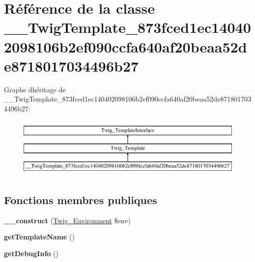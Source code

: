 \hypertarget{class_____twig_template__873fced1ec140402098106b2ef090ccfa640af20beaa52de8718017034496b27}{}\section{Référence de la classe \+\_\+\+\_\+\+Twig\+Template\+\_\+873fced1ec140402098106b2ef090ccfa640af20beaa52de8718017034496b27}
\label{class_____twig_template__873fced1ec140402098106b2ef090ccfa640af20beaa52de8718017034496b27}
Graphe d\textquotesingle{}héritage de \+\_\+\+\_\+\+Twig\+Template\+\_\+873fced1ec140402098106b2ef090ccfa640af20beaa52de8718017034496b27\+:\begin{figure}[H]
\begin{center}
\leavevmode
\includegraphics[height=3.000000cm]{class_____twig_template__873fced1ec140402098106b2ef090ccfa640af20beaa52de8718017034496b27}
\end{center}
\end{figure}
\subsection*{Fonctions membres publiques}
\begin{DoxyCompactItemize}
\item 
{\bfseries \+\_\+\+\_\+construct} (\hyperlink{class_twig___environment}{Twig\+\_\+\+Environment} \$env)\hypertarget{class_____twig_template__873fced1ec140402098106b2ef090ccfa640af20beaa52de8718017034496b27_a4f8326243132c1450a81e0a817aa1be7}{}\label{class_____twig_template__873fced1ec140402098106b2ef090ccfa640af20beaa52de8718017034496b27_a4f8326243132c1450a81e0a817aa1be7}

\item 
{\bfseries get\+Template\+Name} ()\hypertarget{class_____twig_template__873fced1ec140402098106b2ef090ccfa640af20beaa52de8718017034496b27_a621a3ccd148ed8b9e937da6959c98f39}{}\label{class_____twig_template__873fced1ec140402098106b2ef090ccfa640af20beaa52de8718017034496b27_a621a3ccd148ed8b9e937da6959c98f39}

\item 
{\bfseries get\+Debug\+Info} ()\hypertarget{class_____twig_template__873fced1ec140402098106b2ef090ccfa640af20beaa52de8718017034496b27_abd0ecb0136f4228db2bd963bfc1e20d7}{}\label{class_____twig_template__873fced1ec140402098106b2ef090ccfa640af20beaa52de8718017034496b27_abd0ecb0136f4228db2bd963bfc1e20d7}

\end{DoxyCompactItemize}
